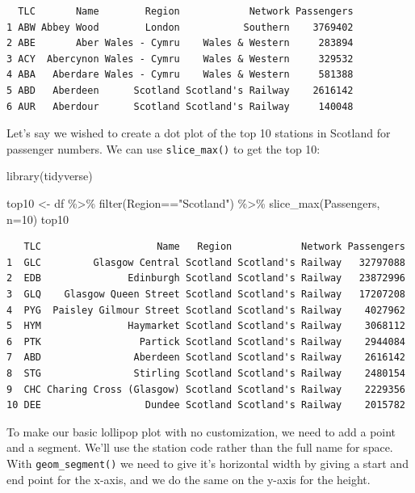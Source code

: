 \documentclass[
  letterpaper,
  DIV=11,
  numbers=noendperiod]{scrreprt}
\newenvironment{Shaded}{\begin{snugshade}}{\end{snugshade}}
\newcommand{\AttributeTok}[1]{\textcolor[rgb]{0.40,0.45,0.13}{#1}}
\newcommand{\DecValTok}[1]{\textcolor[rgb]{0.68,0.00,0.00}{#1}}
\newcommand{\FunctionTok}[1]{\textcolor[rgb]{0.28,0.35,0.67}{#1}}
\newcommand{\NormalTok}[1]{\textcolor[rgb]{0.00,0.23,0.31}{#1}}
\newcommand{\OtherTok}[1]{\textcolor[rgb]{0.00,0.23,0.31}{#1}}
\newcommand{\SpecialCharTok}[1]{\textcolor[rgb]{0.37,0.37,0.37}{#1}}
\newcommand{\StringTok}[1]{\textcolor[rgb]{0.13,0.47,0.30}{#1}}
\begin{document}
\begin{verbatim}
  TLC       Name        Region            Network Passengers
1 ABW Abbey Wood        London           Southern    3769402
2 ABE       Aber Wales - Cymru    Wales & Western     283894
3 ACY  Abercynon Wales - Cymru    Wales & Western     329532
4 ABA   Aberdare Wales - Cymru    Wales & Western     581388
5 ABD   Aberdeen      Scotland Scotland's Railway    2616142
6 AUR   Aberdour      Scotland Scotland's Railway     140048
\end{verbatim}

Let's say we wished to create a dot plot of the top 10 stations in
Scotland for passenger numbers. We can use \texttt{slice\_max()} to get
the top 10:

\begin{Shaded}
\begin{Highlighting}[]
\FunctionTok{library}\NormalTok{(tidyverse)}

\NormalTok{top10 }\OtherTok{\textless{}{-}}\NormalTok{ df }\SpecialCharTok{\%\textgreater{}\%} \FunctionTok{filter}\NormalTok{(Region}\SpecialCharTok{==}\StringTok{"Scotland"}\NormalTok{) }\SpecialCharTok{\%\textgreater{}\%} \FunctionTok{slice\_max}\NormalTok{(Passengers, }\AttributeTok{n=}\DecValTok{10}\NormalTok{)}
\NormalTok{top10}
\end{Highlighting}
\end{Shaded}

\begin{verbatim}
   TLC                    Name   Region            Network Passengers
1  GLC         Glasgow Central Scotland Scotland's Railway   32797088
2  EDB               Edinburgh Scotland Scotland's Railway   23872996
3  GLQ    Glasgow Queen Street Scotland Scotland's Railway   17207208
4  PYG  Paisley Gilmour Street Scotland Scotland's Railway    4027962
5  HYM               Haymarket Scotland Scotland's Railway    3068112
6  PTK                 Partick Scotland Scotland's Railway    2944084
7  ABD                Aberdeen Scotland Scotland's Railway    2616142
8  STG                Stirling Scotland Scotland's Railway    2480154
9  CHC Charing Cross (Glasgow) Scotland Scotland's Railway    2229356
10 DEE                  Dundee Scotland Scotland's Railway    2015782
\end{verbatim}

To make our basic lollipop plot with no customization, we need to add a
point and a segment. We'll use the station code rather than the full
name for space. With \texttt{geom\_segment()} we need to give it's
horizontal width by giving a start and end point for the x-axis, and we
do the same on the y-axis for the height.
\end{document}
